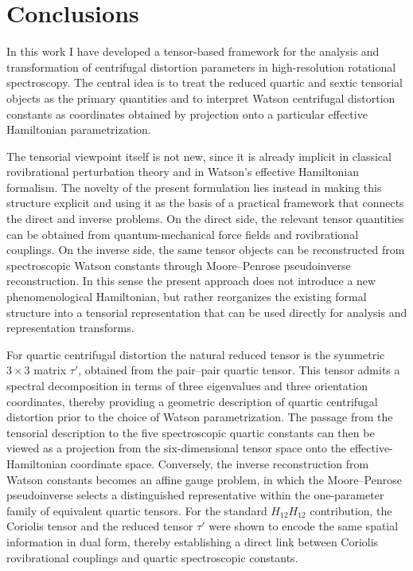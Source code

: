 \section{Conclusions}

In this work I have developed a tensor-based framework for the
analysis and transformation of centrifugal distortion parameters in
high-resolution rotational spectroscopy. The central idea is to treat
the reduced quartic and sextic tensorial objects as the primary
quantities and to interpret Watson centrifugal distortion constants as
coordinates obtained by projection onto a particular effective
Hamiltonian parametrization.

The tensorial viewpoint itself is not new, since it is already implicit
in classical rovibrational perturbation theory and in Watson's
effective Hamiltonian formalism. The novelty of the present
formulation lies instead in making this structure explicit and using it
as the basis of a practical framework that connects the direct and
inverse problems. On the direct side, the relevant tensor quantities
can be obtained from quantum-mechanical force fields and rovibrational
couplings. On the inverse side, the same tensor objects can be
reconstructed from spectroscopic Watson constants through
Moore--Penrose pseudoinverse reconstruction. In this sense the present
approach does not introduce a new phenomenological Hamiltonian, but
rather reorganizes the existing formal structure into a tensorial
representation that can be used directly for analysis and
representation transforms.

For quartic centrifugal distortion the natural reduced tensor is the
symmetric $3\times3$ matrix $\tau'$, obtained from the pair--pair
quartic tensor. This tensor admits a spectral decomposition in terms
of three eigenvalues and three orientation coordinates, thereby
providing a geometric description of quartic centrifugal distortion
prior to the choice of Watson parametrization. The passage from the
tensorial description to the five spectroscopic quartic constants can
then be viewed as a projection from the six-dimensional tensor space
onto the effective-Hamiltonian coordinate space. Conversely, the
inverse reconstruction from Watson constants becomes an affine gauge
problem, in which the Moore--Penrose pseudoinverse selects a
distinguished representative within the one-parameter family of
equivalent quartic tensors. For the standard $H_{12}H_{12}$
contribution, the Coriolis tensor and the reduced tensor $\tau'$ were
shown to encode the same spatial information in dual form, thereby
establishing a direct link between Coriolis rovibrational couplings
and quartic spectroscopic constants.


